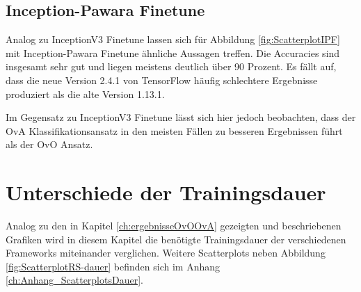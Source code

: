 \subsection{Inception-Pawara Finetune}
Analog zu InceptionV3 Finetune lassen sich für Abbildung \ref{fig:ScatterplotIPF} mit Inception-Pawara Finetune ähnliche Aussagen treffen. Die Accuracies sind insgesamt sehr gut und liegen meistens deutlich über 90 Prozent.
Es fällt auf, dass die neue Version 2.4.1 von TensorFlow \cite{tensorflow} häufig schlechtere Ergebnisse produziert als die alte Version 1.13.1.

Im Gegensatz zu InceptionV3 Finetune lässt sich hier jedoch beobachten, dass der OvA Klassifikationsansatz in den meisten Fällen zu besseren Ergebnissen führt als der OvO Ansatz.




\section{Unterschiede der Trainingsdauer}
\label{ch:ergebnisseOvOOvA-Dauer}
Analog zu den in Kapitel \ref{ch:ergebnisseOvOOvA} gezeigten und beschriebenen Grafiken wird in diesem Kapitel die benötigte Trainingsdauer der verschiedenen Frameworks miteinander verglichen. Weitere Scatterplots neben Abbildung \ref{fig:ScatterplotRS-dauer} befinden sich im Anhang \ref{ch:Anhang_ScatterplotsDauer}.\\

